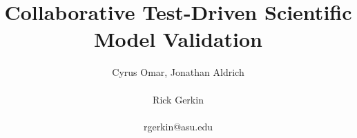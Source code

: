 \documentclass[9pt]{sig-alternate}
\begin{document}
%
\title{Collaborative Test-Driven Scientific Model Validation}


\author{\alignauthor
Cyrus Omar, Jonathan Aldrich\\\\
       \alignauthor Rick Gerkin\\
       \\{rgerkin@asu.edu}
}


% 








\maketitle
\end{document}
